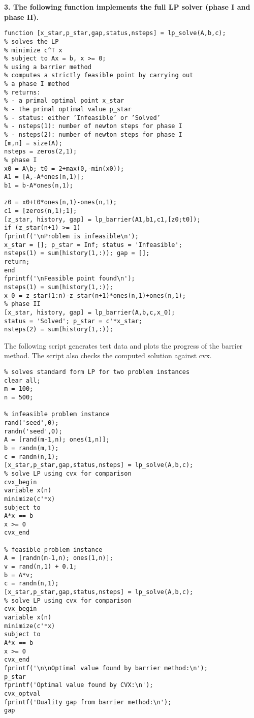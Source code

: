 \documentclass{article}
\begin{document}
\textbf{3. The following function implements the full LP solver (phase I and phase II).}

\begin{verbatim}
function [x_star,p_star,gap,status,nsteps] = lp_solve(A,b,c);
% solves the LP
% minimize c^T x
% subject to Ax = b, x >= 0;
% using a barrier method
% computes a strictly feasible point by carrying out
% a phase I method
% returns:
% - a primal optimal point x_star
% - the primal optimal value p_star
% - status: either ’Infeasible’ or ’Solved’
% - nsteps(1): number of newton steps for phase I
% - nsteps(2): number of newton steps for phase I
[m,n] = size(A);
nsteps = zeros(2,1);
% phase I
x0 = A\b; t0 = 2+max(0,-min(x0));
A1 = [A,-A*ones(n,1)];
b1 = b-A*ones(n,1);

z0 = x0+t0*ones(n,1)-ones(n,1);
c1 = [zeros(n,1);1];
[z_star, history, gap] = lp_barrier(A1,b1,c1,[z0;t0]);
if (z_star(n+1) >= 1)
fprintf('\nProblem is infeasible\n');
x_star = []; p_star = Inf; status = 'Infeasible';
nsteps(1) = sum(history(1,:)); gap = [];
return;
end
fprintf('\nFeasible point found\n');
nsteps(1) = sum(history(1,:));
x_0 = z_star(1:n)-z_star(n+1)*ones(n,1)+ones(n,1);
% phase II
[x_star, history, gap] = lp_barrier(A,b,c,x_0);
status = 'Solved'; p_star = c'*x_star;
nsteps(2) = sum(history(1,:));	
\end{verbatim}

The following script generates test data and plots the progress of the barrier method.
The script also checks the computed solution against cvx.

\begin{verbatim}
% solves standard form LP for two problem instances
clear all;
m = 100;
n = 500;

% infeasible problem instance
rand('seed',0);
randn('seed',0);
A = [rand(m-1,n); ones(1,n)];
b = randn(m,1);
c = randn(n,1);
[x_star,p_star,gap,status,nsteps] = lp_solve(A,b,c);
% solve LP using cvx for comparison
cvx_begin
variable x(n)
minimize(c'*x)
subject to
A*x == b
x >= 0
cvx_end

% feasible problem instance
A = [randn(m-1,n); ones(1,n)];
v = rand(n,1) + 0.1;
b = A*v;
c = randn(n,1);
[x_star,p_star,gap,status,nsteps] = lp_solve(A,b,c);
% solve LP using cvx for comparison
cvx_begin
variable x(n)
minimize(c'*x)
subject to
A*x == b
x >= 0
cvx_end
fprintf('\n\nOptimal value found by barrier method:\n');
p_star
fprintf('Optimal value found by CVX:\n');
cvx_optval
fprintf('Duality gap from barrier method:\n');
gap

\end{verbatim}
\end{document}
